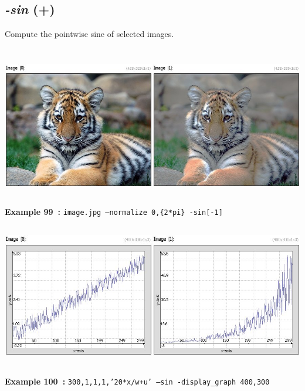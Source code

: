 \documentclass[a4paper,11pt,twoside]{book}
\begin{document}
\subsection{\emph{-sin} (+)}\vspace*{-0.5em}
Compute the pointwise sine of selected images.
\begin{center}\includegraphics[keepaspectratio=true,height=7cm,width=\textwidth]{img/gmic_def99.jpg}\\
{\footnotesize \textbf{Example 99~:} \texttt{image.jpg --normalize 0,\{2*pi\} -sin[-1]}}
\\\includegraphics[keepaspectratio=true,height=7cm,width=\textwidth]{img/gmic_def100.jpg}\\
{\footnotesize \textbf{Example 100~:} \texttt{300,1,1,1,'20*x/w+u' --sin -display\_graph 400,300}}
\end{center}
\end{document}
